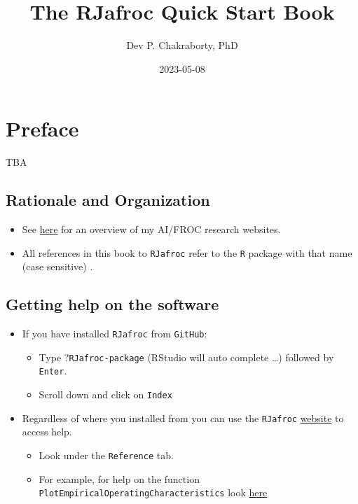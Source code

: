\documentclass[
]{book}
\title{The RJafroc Quick Start Book}
\author{Dev P. Chakraborty, PhD}
\date{2023-05-08}
\providecommand{\tightlist}{%
  \setlength{\itemsep}{0pt}\setlength{\parskip}{0pt}}
\begin{document}
\maketitle

{
\setcounter{tocdepth}{1}
\tableofcontents
}
\hypertarget{quick-start-index-preface}{%
\chapter{Preface}\label{quick-start-index-preface}}

TBA

\hypertarget{quick-start-index-rationale-and-organization}{%
\section{Rationale and Organization}\label{quick-start-index-rationale-and-organization}}

\begin{itemize}
\tightlist
\item
  See \href{https://dpc10ster.github.io/ai-froc-research/}{here} for an overview of my AI/FROC research websites.
\item
  All references in this book to \texttt{RJafroc} refer to the \texttt{R} package with that name (case sensitive) \citep{R-RJafroc}.
\end{itemize}

\hypertarget{quick-start-index-getting-help}{%
\section{Getting help on the software}\label{quick-start-index-getting-help}}

\begin{itemize}
\tightlist
\item
  If you have installed \texttt{RJafroc} from \texttt{GitHub}:

  \begin{itemize}
  \tightlist
  \item
    Type ?\texttt{RJafroc-package} (RStudio will auto complete \ldots) followed by \texttt{Enter}.
  \item
    Scroll down and click on \texttt{Index}
  \end{itemize}
\item
  Regardless of where you installed from you can use the \texttt{RJafroc} \href{https://dpc10ster.github.io/RJafroc/}{website} to access help.

  \begin{itemize}
  \tightlist
  \item
    Look under the \texttt{Reference} tab.
  \item
    For example, for help on the function \texttt{PlotEmpiricalOperatingCharacteristics} look \href{https://dpc10ster.github.io/RJafroc/reference/PlotEmpiricalOperatingCharacteristics.html}{here}
  \end{itemize}
\end{itemize}
\end{document}
